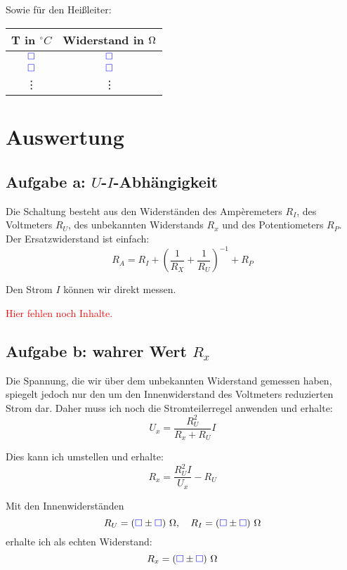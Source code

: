 \documentclass[11pt,german]{article}
\newcommand{\messwert}{\textcolor{blue}{\square}}
\newcommand{\emesswert}{\left(\messwert \pm \messwert \right)}
\newcommand{\fehlt}{\textcolor{red}{Hier fehlen noch Inhalte.}}
\begin{document}
Sowie für den Heißleiter:

\begin{center}
	\begin{tabular}{cc}
		T in $\unit{^\circ C}$ & Widerstand in $\unit \Omega$ \\
		\hline
		$\messwert$ & $\messwert$ \\
		$\messwert$ & $\messwert$ \\
		   \vdots & \vdots
	\end{tabular}
\end{center}


\section{Auswertung}

\subsection{Aufgabe a: $U$-$I$-Abhängigkeit}

Die Schaltung besteht aus den Widerständen des Ampèremeters $R_I$, des Voltmeters $R_U$, des unbekannten Widerstands $R_x$ und des Potentiometers $R_P$.  Der Ersatzwiderstand ist einfach:
\[ R_A = R_I + \left( \frac{1}{R_X} + \frac 1{R_U} \right)^{-1} + R_P \]

Den Strom $I$ können wir direkt messen.

\fehlt

\subsection{Aufgabe b: wahrer Wert $R_x$}

Die Spannung, die wir über dem unbekannten Widerstand gemessen haben, spiegelt jedoch nur den um den Innenwiderstand des Voltmeters reduzierten Strom dar. Daher muss ich noch die Stromteilerregel anwenden und erhalte:
\[ U_x = \frac{R_U^2}{R_x + R_U} I \]

Dies kann ich umstellen und erhalte:
\[ R_x = \frac{R_U^2 I}{U_x} - R_U \]

Mit den Innenwiderständen
\[
	R_U = \unit[\emesswert] \Omega,
	\quad
	R_I = \unit[\emesswert] \Omega
\]
erhalte ich als echten Widerstand:
\[ R_x = \unit[\emesswert] \Omega \]
\end{document}
